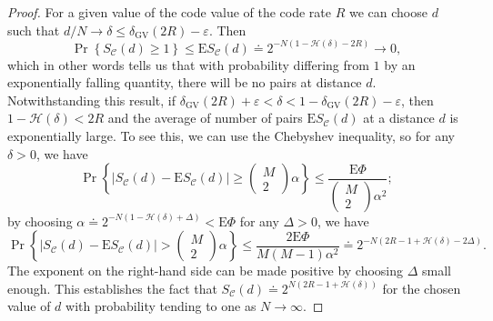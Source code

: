 \begin{proof}
For a given value of the code value of the code rate $R$ we can choose $d$ such that $d/N\to\delta \leq \delta_{\mathrm{GV}}(2 R)-\varepsilon$. Then
\begin{equation}
\operatorname{Pr}\left\{S_{\mathcal{C}}(d) \geq 1\right\} \leq \mathrm{E} S_{\mathcal{C}}(d) \doteq 2^{-N(1-\mathcal{H}(\delta)-2 R)} \rightarrow 0,
\end{equation}
which in other words tells us that with probability differing from $1$ by an exponentially falling quantity, there will be no pairs at distance $d$. Notwithstanding this result, if $\delta_{\mathrm{GV}}(2 R)+\varepsilon<\delta<1-\delta_{\mathrm{GV}}(2 R)-\varepsilon$, then $1-\mathcal{H}(\delta)<2R$ and the average of number of pairs $\mathrm{E} S_{\mathcal{C}}(d)$ at a distance $d$ is exponentially large. To see this, we can use the Chebyshev inequality, so for any $\delta>0$, we have 
\begin{equation}
\operatorname{Pr}\left\{\left|S_{\mathcal{C}}(d)-\mathrm{E} S_{\mathcal{C}}(d)\right| \geq\left(\begin{array}{c}
M \\
2
\end{array}\right) \alpha\right\} \leq \frac{\mathrm{E} \Phi}{\left(\begin{array}{c}
M \\
2
\end{array}\right) \alpha^{2}};
\end{equation}
by choosing $\alpha \doteq 2^{-N(1-\mathcal{H}(\delta)+\Delta)}<\mathrm{E} \Phi$ for any $\Delta>0$, we have
\begin{equation}
\operatorname{Pr}\left\{\left|S_{\mathcal{C}}(d)-\mathrm{E} S_{\mathcal{C}}(d)\right|>\left(\begin{array}{c}
M \\
2
\end{array}\right) \alpha\right\}\leq \frac{2 \mathrm{E} \Phi}{M(M-1) \alpha^{2}} \doteq 2^{-N(2 R-1+\mathcal{H}(\delta)-2 \Delta)}.
\end{equation}
The exponent on the right-hand side can be made positive by choosing $\Delta$ small enough. This establishes the fact that $S_{\mathcal{C}}(d)\doteq 2^{N(2 R-1+\mathcal{H}(\delta))}$ for the chosen value of $d$ with probability tending to one as $N\to\infty$.
\end{proof}
